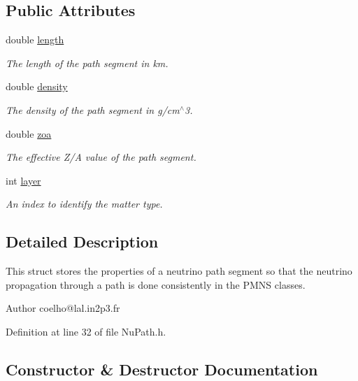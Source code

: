 \subsection*{Public Attributes}
\begin{DoxyCompactItemize}
\item 
double \hyperlink{structOscProb_1_1NuPath_af22660894b6e25cf835500381b155557}{length}
\begin{DoxyCompactList}\small\item\em The length of the path segment in km. \end{DoxyCompactList}\item 
double \hyperlink{structOscProb_1_1NuPath_a54ddd451db69bc54434de3cf18a117ca}{density}
\begin{DoxyCompactList}\small\item\em The density of the path segment in g/cm$^\wedge$3. \end{DoxyCompactList}\item 
double \hyperlink{structOscProb_1_1NuPath_af3213f3691ba83c6bc05f4a3490f6b31}{zoa}
\begin{DoxyCompactList}\small\item\em The effective Z/A value of the path segment. \end{DoxyCompactList}\item 
int \hyperlink{structOscProb_1_1NuPath_a442b160899e554ad1d800989510d5309}{layer}
\begin{DoxyCompactList}\small\item\em An index to identify the matter type. \end{DoxyCompactList}\end{DoxyCompactItemize}


\subsection{Detailed Description}
This struct stores the properties of a neutrino path segment so that the neutrino propagation through a path is done consistently in the P\+M\+NS classes.

\begin{DoxyAuthor}{Author}
coelho@lal.\+in2p3.\+fr 
\end{DoxyAuthor}


Definition at line 32 of file Nu\+Path.\+h.



\subsection{Constructor \& Destructor Documentation}
\mbox{\label{structOscProb_1_1NuPath_a1cc885eb24b3152596ac2f8500f81ae6}} 
